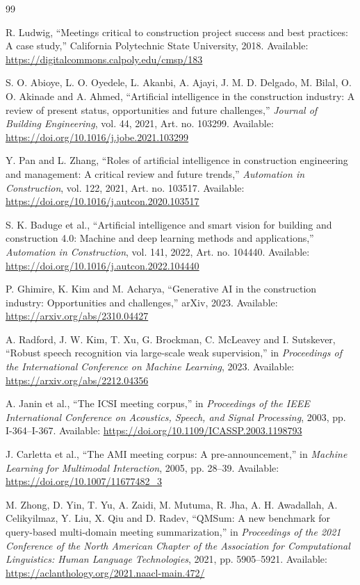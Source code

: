 \documentclass[11pt,a4paper]{article}
\begin{document}
\begin{thebibliography}{99}

R. Ludwig, ``Meetings critical to construction project success and best practices: A case study,'' California Polytechnic State University, 2018. Available: \url{https://digitalcommons.calpoly.edu/cmsp/183}

S. O. Abioye, L. O. Oyedele, L. Akanbi, A. Ajayi, J. M. D. Delgado, M. Bilal, O. O. Akinade and A. Ahmed, ``Artificial intelligence in the construction industry: A review of present status, opportunities and future challenges,'' \textit{Journal of Building Engineering}, vol. 44, 2021, Art. no. 103299. Available: \url{https://doi.org/10.1016/j.jobe.2021.103299}

Y. Pan and L. Zhang, ``Roles of artificial intelligence in construction engineering and management: A critical review and future trends,'' \textit{Automation in Construction}, vol. 122, 2021, Art. no. 103517. Available: \url{https://doi.org/10.1016/j.autcon.2020.103517}

S. K. Baduge et al., ``Artificial intelligence and smart vision for building and construction 4.0: Machine and deep learning methods and applications,'' \textit{Automation in Construction}, vol. 141, 2022, Art. no. 104440. Available: \url{https://doi.org/10.1016/j.autcon.2022.104440}

P. Ghimire, K. Kim and M. Acharya, ``Generative AI in the construction industry: Opportunities and challenges,'' arXiv, 2023. Available: \url{https://arxiv.org/abs/2310.04427}

A. Radford, J. W. Kim, T. Xu, G. Brockman, C. McLeavey and I. Sutskever, ``Robust speech recognition via large-scale weak supervision,'' in \textit{Proceedings of the International Conference on Machine Learning}, 2023. Available: \url{https://arxiv.org/abs/2212.04356}

A. Janin et al., ``The ICSI meeting corpus,'' in \textit{Proceedings of the IEEE International Conference on Acoustics, Speech, and Signal Processing}, 2003, pp. I-364--I-367. Available: \url{https://doi.org/10.1109/ICASSP.2003.1198793}

J. Carletta et al., ``The AMI meeting corpus: A pre-announcement,'' in \textit{Machine Learning for Multimodal Interaction}, 2005, pp. 28--39. Available: \url{https://doi.org/10.1007/11677482_3}

M. Zhong, D. Yin, T. Yu, A. Zaidi, M. Mutuma, R. Jha, A. H. Awadallah, A. Celikyilmaz, Y. Liu, X. Qiu and D. Radev, ``QMSum: A new benchmark for query-based multi-domain meeting summarization,'' in \textit{Proceedings of the 2021 Conference of the North American Chapter of the Association for Computational Linguistics: Human Language Technologies}, 2021, pp. 5905--5921. Available: \url{https://aclanthology.org/2021.naacl-main.472/}


\end{thebibliography}
\end{document}
